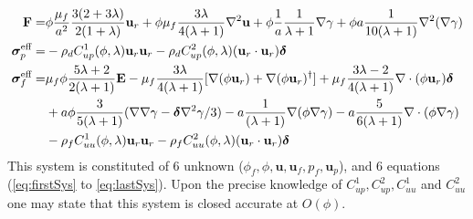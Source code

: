 \begin{align}
    \textbf{F}=&
    \phi
    \frac{\mu_f}{a^2}
    \frac{3(2+3\lambda)}{2(1+\lambda)}\textbf{u}_r
    + \phi\mu_f  \frac{3\lambda}{4(\lambda +1)} \grad^2 \textbf{u}
    + \phi \frac{1}{a}\frac{1}{\lambda +1} \grad \gamma
    + \phi a \frac{1}{10(\lambda +1)}\grad^2(\grad\gamma)\\
    \bm\sigma_p^\text{eff}
    =&
    -\rho_d C^1_{up}(\phi,\lambda) \textbf{u}_r \textbf{u}_r
    -\rho_d C^2_{up}(\phi,\lambda) (\textbf{u}_r \cdot \textbf{u}_r)\bm\delta\\
    \bm\sigma_f^\text{eff}
    =&
     \mu_f \phi \frac{5\lambda +2}{2(\lambda+1)} \textbf{E}
    - \mu_f \frac{3\lambda}{4(\lambda+1)} [
    \grad(\phi \textbf{u}_r)
    + \grad(\phi \textbf{u}_r)^\dagger]
    + \mu_f \frac{3\lambda - 2}{4(\lambda+1)} \div(\phi \textbf{u}_r)  \bm\delta\nonumber\\
    &+ a\phi \frac{3}{5(\lambda+1)}(\grad\grad\gamma-\bm\delta \grad^2\gamma/3)
    - a \frac{1}{(\lambda+1)}\grad (\phi \grad \gamma)
    - a \frac{5}{6(\lambda+1)}\div (\phi \grad \gamma)
    \nonumber \\
    &-\rho_f C^1_{uu}(\phi,\lambda)  \textbf{u}_r \textbf{u}_r
    -\rho_f C^2_{uu} (\phi,\lambda) (\textbf{u}_r \cdot \textbf{u}_r)\bm\delta
    \label{eq:sigma_feffff}
\end{align}
This system is constituted of 6 unknown ($\phi_f,\phi,\textbf{u},\textbf{u}_f,p_f,\textbf{u}_p$), and 6 equations (\ref{eq:firstSys} to \ref{eq:lastSys}).  
Upon the precise knowledge of $C^1_{up}, C^2_{up}, C^1_{uu}$ and $C^2_{uu}$ one may state that this system is closed accurate at $O(\phi)$. 

